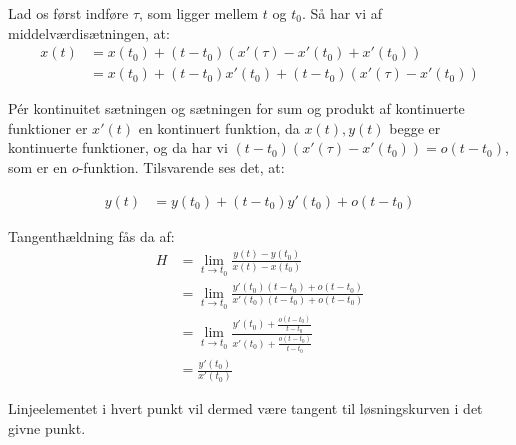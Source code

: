 Lad os først indføre $\tau$, som ligger mellem $t$ og $t_0$. Så har vi af middelværdisætningen, at:
\begin{align*}
    x(t) &= x(t_0) + (t-t_0)(x'(\tau) - x'(t_0) + x'(t_0))\\
    &= x(t_0) + (t-t_0)x'(t_0) + (t-t_0)(x'(\tau)-x'(t_0))
\end{align*}

Pér kontinuitet sætningen \citep[sætning 5.4, s. 71 ]{Analyse bog} og sætningen for sum og produkt af kontinuerte funktioner \citep[sætning 6.21, s. 94]{Analyse bog} er $x'(t)$ en kontinuert funktion, da $x(t),y(t)$ begge er kontinuerte funktioner, og da har vi $(t-t_0)(x'(\tau)-x'(t_0)) = o(t-t_0)$, som er en $o$-funktion. Tilsvarende ses det, at:

\begin{align*}
    y(t) &= y(t_0) + (t-t_0)y'(t_0) + o(t-t_0)
\end{align*}

Tangenthældning fås da af:
\begin{equation} \label{dydt}
\begin{split}
    H &= \lim_{t \to t_0} \frac{y(t)-y(t_0)}{x(t)-x(t_0)}\\
    &= \lim_{t \to t_0}\frac{y'(t_0)(t-t_0) + o(t-t_0)}{x'(t_0)(t-t_0) + o(t-t_0)}\\
    &= \lim_{t \to t_0}\frac{y'(t_0) + \frac{o(t-t_0)}{t-t_0}}{x'(t_0) + \frac{o(t-t_0)}{t-t_0}}\\
    &= \frac{y'(t_0)}{x'(t_0)}
\end{split}
\end{equation}

Linjeelementet i hvert punkt vil dermed være tangent til løsningskurven i det givne punkt.

